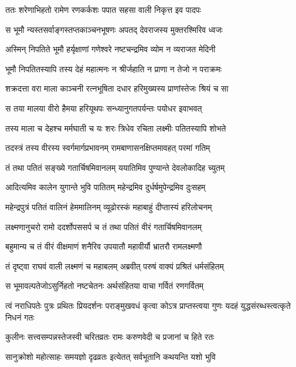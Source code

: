 
\twolineshloka
{ततः शरेणाभिहतो रामेण रणकर्कशः}
{पपात सहसा वाली निकृत्त इव पादपः} %

\twolineshloka
{स भूमौ न्यस्तसर्वाङ्गस्तप्तकाञ्चनभूषणः}
{अपतद् देवराजस्य मुक्तरश्मिरिव ध्वजः} %

\twolineshloka
{अस्मिन् निपतिते भूमौ हर्यृक्षाणां गणेश्वरे}
{नष्टचन्द्रमिव व्योम न व्यराजत मेदिनी} %

\twolineshloka
{भूमौ निपतितस्यापि तस्य देहं महात्मनः}
{न श्रीर्जहाति न प्राणा न तेजो न पराक्रमः} %

\twolineshloka
{शक्रदत्ता वरा माला काञ्चनी रत्नभूषिता}
{दधार हरिमुख्यस्य प्राणांस्तेजः श्रियं च सा} %

\twolineshloka
{स तया मालया वीरो हैमया हरियूथपः}
{सन्ध्यानुगतपर्यन्तः पयोधर इवाभवत्} %

\twolineshloka
{तस्य माला च देहश्च मर्मघाती च यः शरः}
{त्रिधेव रचिता लक्ष्मीः पतितस्यापि शोभते} %

\twolineshloka
{तदस्त्रं तस्य वीरस्य स्वर्गमार्गप्रभावनम्}
{रामबाणासनक्षिप्तमावहत् परमां गतिम्} %

\twolineshloka
{तं तथा पतितं सङ्ख्ये गतार्चिषमिवानलम्}
{ययातिमिव पुण्यान्ते देवलोकादिह च्युतम्} %

\twolineshloka
{आदित्यमिव कालेन युगान्ते भुवि पातितम्}
{महेन्द्रमिव दुर्धर्षमुपेन्द्रमिव दुःसहम्} %

\twolineshloka
{महेन्द्रपुत्रं पतितं वालिनं हेममालिनम्}
{व्यूढोरस्कं महाबाहुं दीप्तास्यं हरिलोचनम्} %

\twolineshloka
{लक्ष्मणानुचरो रामो ददर्शोपससर्प च}
{तं तथा पतितं वीरं गतार्चिषमिवानलम्} %

\twolineshloka
{बहुमान्य च तं वीरं वीक्षमाणं शनैरिव}
{उपयातौ महावीर्यौ भ्रातरौ रामलक्ष्मणौ} %

\twolineshloka
{तं दृष्ट्वा राघवं वाली लक्ष्मणं च महाबलम्}
{अब्रवीत् परुषं वाक्यं प्रश्रितं धर्मसंहितम्} %

\twolineshloka
{स भूमावल्पतेजोऽसुर्निहतो नष्टचेतनः}
{अर्थसंहितया वाचा गर्वितं रणगर्वितम्} %

\threelineshloka
{त्वं नराधिपतेः पुत्रः प्रथितः प्रियदर्शनः}
{पराङ्मुखवधं कृत्वा कोऽत्र प्राप्तस्त्वया गुणः}
{यदहं युद्धसंरब्धस्त्वत्कृते निधनं गतः} %

\twolineshloka
{कुलीनः सत्त्वसम्पन्नस्तेजस्वी चरितव्रतः}
{रामः करुणवेदी च प्रजानां च हिते रतः} %

\twolineshloka
{सानुक्रोशो महोत्साहः समयज्ञो दृढव्रतः}
{इत्येतत् सर्वभूतानि कथयन्ति यशो भुवि} %

